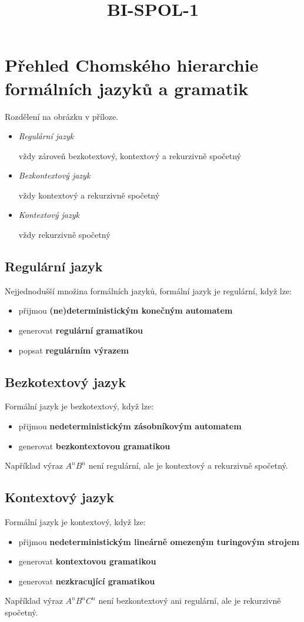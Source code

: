 \documentclass{../../szzclass}
\begin{document}
\title{BI-SPOL-1}
\section{Přehled Chomského hierarchie formálních ja\-zyků a gramatik}

Rozdělení na obrázku v příloze.

\begin{itemize}
    \item \textit{Regulární jazyk} 
     
    vždy zároveň bezkotextový, kontextový a rekurzivně spočetný
    \item \textit{Bezkontextový jazyk}
    
    vždy kontextový a rekurzivně spočetný
    \item \textit{Kontextový jazyk}
     
    vždy rekurzivně spočetný
\end{itemize}

\subsection{Regulární jazyk}
Nejjednodušší množina formálních jazyků, formální jazyk je regulární, když lze:
\begin{itemize}
	\item přijmou \textbf{(ne)deterministickým konečným automatem}
	\item generovat \textbf{regulární gramatikou}
	\item popsat \textbf{regulárním výrazem}
\end{itemize}

\subsection{Bezkotextový jazyk}
Formální jazyk je bezkotextový, když lze:
\begin{itemize}
	\item přijmou \textbf{nedeterministickým zásobníkovým automatem}
	\item generovat \textbf{bezkontextovou gramatikou}
\end{itemize}
Například výraz $A^nB^n$ není regulární, ale je kontextový a rekurzivně spočetný.

\subsection{Kontextový jazyk}
Formální jazyk je kontextový, když lze:
\begin{itemize}
	\item přijmou \textbf{nedeterministickým lineárně omezeným turingovým strojem}
	\item generovat \textbf{kontextovou gramatikou}
	\item generovat \textbf{nezkracující gramatikou}
\end{itemize}
Například výraz $A^nB^nC^n$ není bezkontextový ani regulární, ale je rekurzivně spočetný. 
\end{document}
